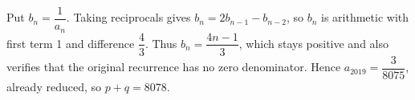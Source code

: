 Put $b_n=\dfrac{1}{a_n}$. Taking reciprocals gives $b_n=2b_{n-1}-b_{n-2}$, so $b_n$ is arithmetic with first term 1 and difference $\dfrac{4}{3}$. Thus $b_n=\dfrac{4n-1}{3}$, which stays positive and also verifies that the original recurrence has no zero denominator. Hence $a_{2019}=\dfrac{3}{8075}$, already reduced, so $p+q=\boxed{8078}$.
